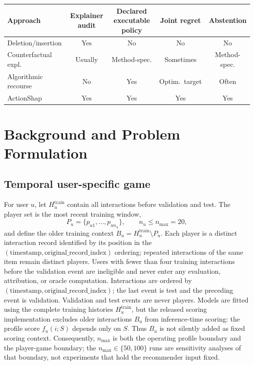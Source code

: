 \documentclass[pdflatex,sn-mathphys-num]{sn-jnl}
\theoremstyle{thmstyleone}
\theoremstyle{thmstyletwo}
\theoremstyle{thmstylethree}
\begin{document}
\FloatBarrier
\begingroup
\makeatletter{}\makeatother
\centering
\scriptsize
\setlength{\tabcolsep}{3pt}
\caption{Positioning by evaluation target.}
\label{tab:positioning}
\begin{tabular}{@{}lcccc@{}}
\toprule
Approach & Explainer audit & Declared executable policy & Joint regret & Abstention\\
\midrule
Deletion/insertion & Yes & No & No & No\\
Counterfactual expl. & Usually & Method-spec. & Sometimes & Method-spec.\\
Algorithmic recourse & No & Yes & Optim.\ target & Often\\
ActionShap & Yes & Yes & Yes & Yes\\
\bottomrule
\end{tabular}
\endgroup
\FloatBarrier

\section{Background and Problem Formulation}
\subsection{Temporal user-specific game}
For user $u$, let $H_u^{\mathrm{train}}$ contain all interactions before validation and test. The player set is the most recent training window,
\begin{equation}
P_u=\{p_{u1},\ldots,p_{un_u}\},\qquad n_u\le n_{\max}=20,
\end{equation}
and define the older training context $B_u=H_u^{\mathrm{train}}\setminus P_u$. Each player is a distinct interaction record identified by its position in the $(\mathrm{timestamp},\mathrm{original\_record\_index})$ ordering; repeated interactions of the same item remain distinct players. Users with fewer than four training interactions before the validation event are ineligible and never enter any evaluation, attribution, or oracle computation. Interactions are ordered by $(\mathrm{timestamp},\mathrm{original\_record\_index})$; the last event is test and the preceding event is validation. Validation and test events are never players. Models are fitted using the complete training histories $H_u^{\mathrm{train}}$, but the released scoring implementation excludes older interactions $B_u$ from inference-time scoring: the profile score $f_u(i;S)$ depends only on $S$. Thus $B_u$ is not silently added as fixed scoring context. Consequently, $n_{\max}$ is both the operating profile boundary and the player-game boundary; the $n_{\max}\in\{50,100\}$ runs are sensitivity analyses of that boundary, not experiments that hold the recommender input fixed.
\end{document}
